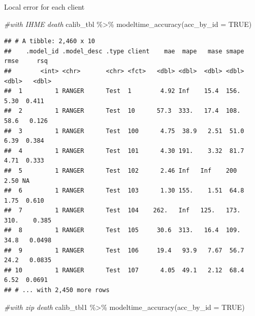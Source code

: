 \documentclass[
]{article}
\newenvironment{Shaded}{\begin{snugshade}}{\end{snugshade}}
\newcommand{\AttributeTok}[1]{\textcolor[rgb]{0.77,0.63,0.00}{#1}}
\newcommand{\CommentTok}[1]{\textcolor[rgb]{0.56,0.35,0.01}{\textit{#1}}}
\newcommand{\ConstantTok}[1]{\textcolor[rgb]{0.00,0.00,0.00}{#1}}
\newcommand{\FunctionTok}[1]{\textcolor[rgb]{0.00,0.00,0.00}{#1}}
\newcommand{\NormalTok}[1]{#1}
\newcommand{\SpecialCharTok}[1]{\textcolor[rgb]{0.00,0.00,0.00}{#1}}
\begin{document}
Local error for each client

\begin{Shaded}
\begin{Highlighting}[]
\CommentTok{\#with IHME death}
\NormalTok{calib\_tbl }\SpecialCharTok{\%\textgreater{}\%} 
    \FunctionTok{modeltime\_accuracy}\NormalTok{(}\AttributeTok{acc\_by\_id =} \ConstantTok{TRUE}\NormalTok{)}
\end{Highlighting}
\end{Shaded}

\begin{verbatim}
## # A tibble: 2,460 x 10
##    .model_id .model_desc .type client    mae  mape   mase smape   rmse     rsq
##        <int> <chr>       <chr> <fct>   <dbl> <dbl>  <dbl> <dbl>  <dbl>   <dbl>
##  1         1 RANGER      Test  1        4.92 Inf    15.4  156.    5.30  0.411 
##  2         1 RANGER      Test  10      57.3  333.   17.4  108.   58.6   0.126 
##  3         1 RANGER      Test  100      4.75  38.9   2.51  51.0   6.39  0.384 
##  4         1 RANGER      Test  101      4.30 191.    3.32  81.7   4.71  0.333 
##  5         1 RANGER      Test  102      2.46 Inf   Inf    200     2.50 NA     
##  6         1 RANGER      Test  103      1.30 155.    1.51  64.8   1.75  0.610 
##  7         1 RANGER      Test  104    262.   Inf   125.   173.  310.    0.385 
##  8         1 RANGER      Test  105     30.6  313.   16.4  109.   34.8   0.0498
##  9         1 RANGER      Test  106     19.4   93.9   7.67  56.7  24.2   0.0835
## 10         1 RANGER      Test  107      4.05  49.1   2.12  68.4   6.52  0.0691
## # ... with 2,450 more rows
\end{verbatim}

\begin{Shaded}
\begin{Highlighting}[]
\CommentTok{\#with zip death}
\NormalTok{calib\_tbl1 }\SpecialCharTok{\%\textgreater{}\%} 
    \FunctionTok{modeltime\_accuracy}\NormalTok{(}\AttributeTok{acc\_by\_id =} \ConstantTok{TRUE}\NormalTok{)}
\end{Highlighting}
\end{Shaded}
\end{document}
